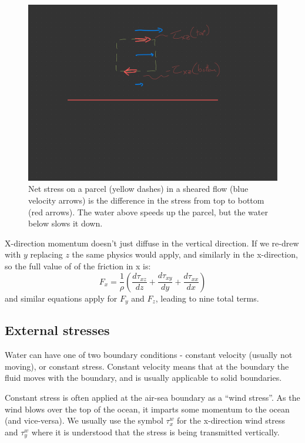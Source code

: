 \begin{figure}[hbt]
  \begin{center}
    \includegraphics{figs/Coriolis/NetStress}
    \caption{Net stress on a parcel (yellow dashes) in a sheared flow (blue velocity arrows) is the difference in the stress from top to bottom (red arrows).  The water above speeds up the parcel, but the water below slows it down.}
    \label{fig:NetStress}  
  \end{center}
\end{figure}

X-direction momentum doesn't just diffuse in the vertical direction.  If we re-drew  with $y$ replacing $z$ the same physics would apply, and similarly in the x-direction, so the full value of of the friction in x is:
\begin{equation}
    F_x = \frac{1}{\rho}\left(\frac{d\tau_{xz}}{dz} + \frac{d\tau_{xy}}{dy} + \frac{d\tau_{xx}}{dx}\right)
\end{equation}
and similar equations apply for $F_y$ and $F_z$, leading to nine total terms.  

\subsection{External stresses}

Water can have one of two boundary conditions - constant velocity (usually not moving), or constant stress.  Constant velocity means that at the boundary the fluid moves with the boundary, and is usually applicable to solid boundaries.  

Constant stress is often applied at the air-sea boundary as a ``wind stress''.  As the wind blows over the top of the ocean, it imparts some momentum to the ocean (and vice-versa).  We usually use the  symbol $\tau_x^w$ for the x-direction wind stress and $\tau^w_y$ where it is understood that the stress is being transmitted vertically.  

